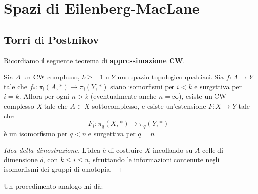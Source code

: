 \chapter{Spazi di Eilenberg-MacLane}

\section{Torri di Postnikov}

Ricordiamo il seguente teorema di \textbf{approssimazione CW}.
\begin{thm}\label{CW-approx}
	Sia $A$ un CW complesso, $k \ge -1$ e $Y$ uno spazio topologico qualsiasi.
	Sia $f:A \to Y$ tale che
	$f_{*}:\pi_{i}(A,\ast) \to \pi_{i}(Y,\ast)$
	siano isomorfismi per $i < k$ e surgettiva per $i = k$.
	Allora per ogni $n > k$ (eventualmente anche $n=\infty$),
	esiste un CW complesso $X$ tale che $A \subset X$ sottocomplesso,
	e esiste un'estensione $F:X \to Y$ tale che
	\begin{equation*}
		F_{i} : \pi_{q}(X,\ast) \longrightarrow \pi_{q}(Y,\ast)
	\end{equation*}
	è un isomorfismo per $q < n$ e surgettiva per $q=n$
	\begin{proof}[Idea della dimostrazione]
		L'idea è di costruire $X$ 
		incollando su $A$ celle di dimensione $d$,
		con $k \le i \le n$,
		sfruttando le informazioni contenute
		negli isomorfismi dei gruppi di omotopia.
	\end{proof}
\end{thm}

Un procedimento analogo mi dà:


